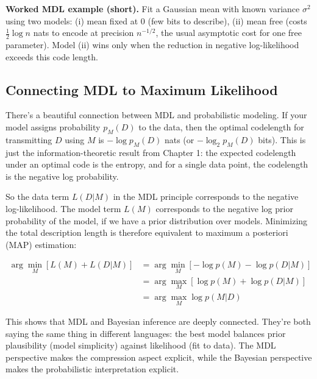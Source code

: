 \vspace{1.5em}
\vspace{1.5em}
\begin{examplebox}
\textbf{Worked MDL example (short).} Fit a Gaussian mean with known variance $\sigma^2$ using two models: (i) mean fixed at 0 (few bits to describe), (ii) mean free (costs $\tfrac{1}{2}\log n$ nats to encode at precision $n^{-1/2}$, the usual asymptotic cost for one free parameter). Model (ii) wins only when the reduction in negative log-likelihood exceeds this code length.
\end{examplebox}
\subsection{Connecting MDL to Maximum Likelihood}

There's a beautiful connection between MDL and probabilistic modeling. If your model assigns probability $p_M(D)$ to the data, then the optimal codelength for transmitting $D$ using $M$ is $-\log p_M(D)$ nats (or $-\log_2 p_M(D)$ bits). This is just the information-theoretic result from Chapter 1: the expected codelength under an optimal code is the entropy, and for a single data point, the codelength is the negative log probability.

\vspace{0.3cm}

So the data term $L(D|M)$ in the MDL principle corresponds to the negative log-likelihood. The model term $L(M)$ corresponds to the negative log prior probability of the model, if we have a prior distribution over models. Minimizing the total description length is therefore equivalent to maximum a posteriori (MAP) estimation:

\vspace{0.3cm}

\begin{align}
\arg\min_M [L(M) + L(D|M)] &= \arg\min_M [-\log p(M) - \log p(D|M)] \\
&= \arg\max_M [\log p(M) + \log p(D|M)] \\
&= \arg\max_M \log p(M|D)
\end{align}

\vspace{0.3cm}

This shows that MDL and Bayesian inference are deeply connected. They're both saying the same thing in different languages: the best model balances prior plausibility (model simplicity) against likelihood (fit to data). The MDL perspective makes the compression aspect explicit, while the Bayesian perspective makes the probabilistic interpretation explicit.

